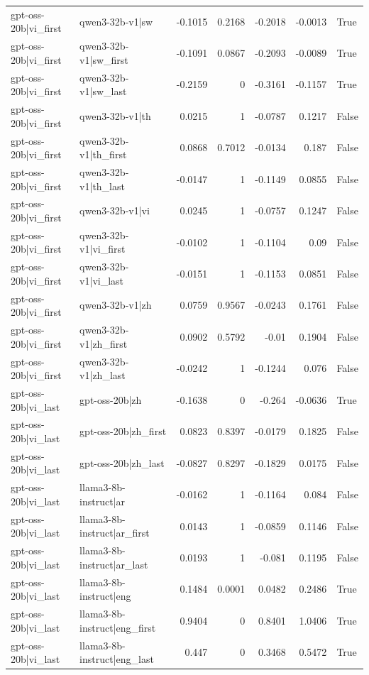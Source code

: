 \begin{table}
\begin{tabular}{l l r r r r l}
gpt-oss-20b|vi_first & qwen3-32b-v1|sw & -0.1015 & 0.2168 & -0.2018 & -0.0013 & True \\
gpt-oss-20b|vi_first & qwen3-32b-v1|sw_first & -0.1091 & 0.0867 & -0.2093 & -0.0089 & True \\
gpt-oss-20b|vi_first & qwen3-32b-v1|sw_last & -0.2159 & 0 & -0.3161 & -0.1157 & True \\
gpt-oss-20b|vi_first & qwen3-32b-v1|th & 0.0215 & 1 & -0.0787 & 0.1217 & False \\
gpt-oss-20b|vi_first & qwen3-32b-v1|th_first & 0.0868 & 0.7012 & -0.0134 & 0.187 & False \\
gpt-oss-20b|vi_first & qwen3-32b-v1|th_last & -0.0147 & 1 & -0.1149 & 0.0855 & False \\
gpt-oss-20b|vi_first & qwen3-32b-v1|vi & 0.0245 & 1 & -0.0757 & 0.1247 & False \\
gpt-oss-20b|vi_first & qwen3-32b-v1|vi_first & -0.0102 & 1 & -0.1104 & 0.09 & False \\
gpt-oss-20b|vi_first & qwen3-32b-v1|vi_last & -0.0151 & 1 & -0.1153 & 0.0851 & False \\
gpt-oss-20b|vi_first & qwen3-32b-v1|zh & 0.0759 & 0.9567 & -0.0243 & 0.1761 & False \\
gpt-oss-20b|vi_first & qwen3-32b-v1|zh_first & 0.0902 & 0.5792 & -0.01 & 0.1904 & False \\
gpt-oss-20b|vi_first & qwen3-32b-v1|zh_last & -0.0242 & 1 & -0.1244 & 0.076 & False \\
gpt-oss-20b|vi_last & gpt-oss-20b|zh & -0.1638 & 0 & -0.264 & -0.0636 & True \\
gpt-oss-20b|vi_last & gpt-oss-20b|zh_first & 0.0823 & 0.8397 & -0.0179 & 0.1825 & False \\
gpt-oss-20b|vi_last & gpt-oss-20b|zh_last & -0.0827 & 0.8297 & -0.1829 & 0.0175 & False \\
gpt-oss-20b|vi_last & llama3-8b-instruct|ar & -0.0162 & 1 & -0.1164 & 0.084 & False \\
gpt-oss-20b|vi_last & llama3-8b-instruct|ar_first & 0.0143 & 1 & -0.0859 & 0.1146 & False \\
gpt-oss-20b|vi_last & llama3-8b-instruct|ar_last & 0.0193 & 1 & -0.081 & 0.1195 & False \\
gpt-oss-20b|vi_last & llama3-8b-instruct|eng & 0.1484 & 0.0001 & 0.0482 & 0.2486 & True \\
gpt-oss-20b|vi_last & llama3-8b-instruct|eng_first & 0.9404 & 0 & 0.8401 & 1.0406 & True \\
gpt-oss-20b|vi_last & llama3-8b-instruct|eng_last & 0.447 & 0 & 0.3468 & 0.5472 & True \\

\end{tabular}
\end{table}
